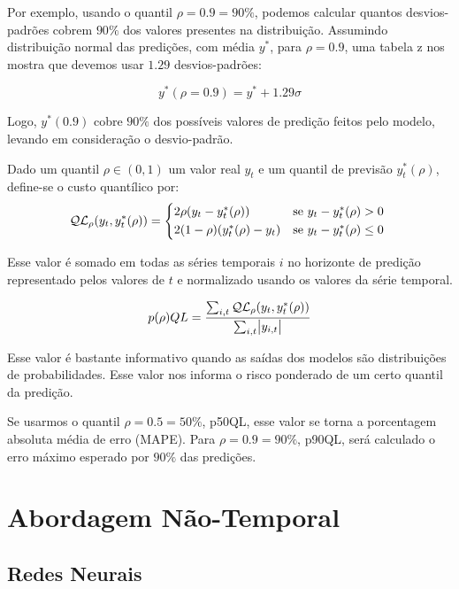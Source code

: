 Por exemplo, usando o quantil $\rho=0.9=90\%$, podemos calcular quantos
desvios-padrões cobrem $90\%$ dos valores presentes na distribuição.
Assumindo distribuição normal das predições, com média $y^*$, para $\rho=0.9$, uma tabela z nos mostra que devemos usar $1.29$ desvios-padrões:

\[
  y^*(\rho = 0.9) = y^* + 1.29\sigma
\]

Logo, $y^*(0.9)$ cobre $90\%$ dos possíveis valores de predição feitos pelo
modelo, levando em consideração o desvio-padrão.

Dado um quantil $\rho \in (0,1)$ um valor real $y_{t}$ e um quantil de previsão 
$y^{*}_{t}(\rho)$, define-se o custo quantílico por: \\

\begin{equation}
  \mathcal{QL}_{\rho}(y_{t},y^{*}_{t}(\rho)) =
\begin{cases*}
  2 \rho(y_{t} - y^{*}_{t}(\rho)) & se $ y_{t} - y^{*}_{t}(\rho) > 0$ \\
  2 (1 - \rho)(y^{*}_{t}(\rho) - y_{t}) & se $y_{t} - y^{*}_{t}(\rho) \leq 0$
\end{cases*}
\end{equation}


Esse valor é somado em todas as séries temporais $i$ no horizonte de predição
representado pelos valores de $t$ e normalizado usando os valores da série temporal.


\[
   p(\rho)QL = \frac{\sum_{i,t}\mathcal{QL}_{\rho}(y_{t},y^{*}_{t}(\rho))}{\sum_{i,t}\abs{y_{i,t}}}
\]


Esse valor é bastante informativo quando as saídas dos modelos são distribuições
de probabilidades. Esse valor nos informa o risco ponderado de um certo quantil
da predição.

Se usarmos o quantil $\rho=0.5=50\%$, p50QL,
esse valor se torna a porcentagem absoluta média de erro (MAPE). Para
$\rho=0.9=90\%$, p90QL, será
calculado o erro máximo esperado por $90\%$ das predições.





\section{Abordagem Não-Temporal} 


\subsection{Redes Neurais}

